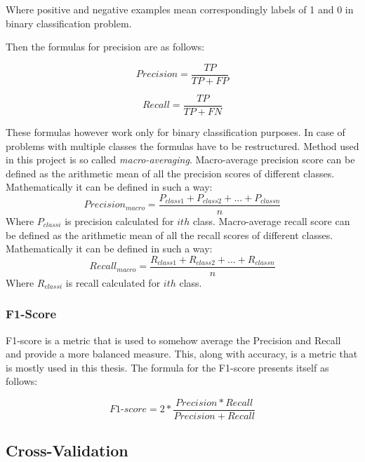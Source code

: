 \documentclass[a4paper,twoside,12pt]{book}
\begin{document}
Where positive and negative examples mean correspondingly labels of 1 and 0 in binary classification problem.


Then the formulas for precision are as follows:

\begin{equation}
Precision = \frac{TP}{TP + FP}
\end{equation}

\begin{equation}
Recall = \frac{TP}{TP + FN}
\end{equation}

These formulas however work only for binary classification purposes. In case of problems with multiple classes the formulas have to be restructured. Method used in this project is so called \emph{macro-averaging}.
\newline
Macro-average precision score can be defined as the arithmetic mean of all the precision scores of different classes. Mathematically it can be defined in such a way:
\begin{equation}
Precision_{macro} = \frac{P_{class1} + P_{class2} + ... + P_{classn}}{n}
\end{equation}
Where $P_{classi}$ is precision calculated for $ith$ class.
\newline
Macro-average recall score can be defined as the arithmetic mean of all the recall scores of different classes. Mathematically it can be defined in such a way:
\begin{equation}
Recall_{macro} = \frac{R_{class1} + R_{class2} + ... + R_{classn}}{n}
\end{equation}
Where $R_{classi}$ is recall calculated for $ith$ class.
\subsubsection{F1-Score}

F1-score is a metric that is used to somehow average the Precision and Recall and provide a more balanced measure. This, along with accuracy, is a metric that is mostly used in this thesis. The formula for the F1-score presents itself as follows:

\begin{equation}
F1\mbox{-}score = 2 * \frac{Precision * Recall}{Precision + Recall}
\end{equation}

\subsection{Cross-Validation}
\end{document}
